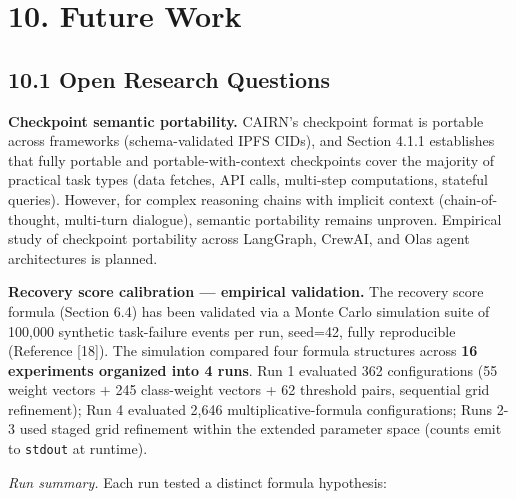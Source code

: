 \documentclass[
  10pt,
]{article}
\begin{document}
\hypertarget{future-work}{%
\section{10. Future Work}\label{future-work}}

\hypertarget{open-research-questions}{%
\subsection{10.1 Open Research
Questions}\label{open-research-questions}}

\textbf{Checkpoint semantic portability.} CAIRN's checkpoint format is
portable across frameworks (schema-validated IPFS CIDs), and Section
4.1.1 establishes that fully portable and portable-with-context
checkpoints cover the majority of practical task types (data fetches,
API calls, multi-step computations, stateful queries). However, for
complex reasoning chains with implicit context (chain-of-thought,
multi-turn dialogue), semantic portability remains unproven. Empirical
study of checkpoint portability across LangGraph, CrewAI, and Olas agent
architectures is planned.

\textbf{Recovery score calibration --- empirical validation.} The
recovery score formula (Section 6.4) has been validated via a Monte
Carlo simulation suite of 100,000 synthetic task-failure events per run,
seed=42, fully reproducible (Reference {[}18{]}). The simulation
compared four formula structures across \textbf{16 experiments organized
into 4 runs}. Run 1 evaluated 362 configurations (55 weight vectors +
245 class-weight vectors + 62 threshold pairs, sequential grid
refinement); Run 4 evaluated 2,646 multiplicative-formula
configurations; Runs 2-3 used staged grid refinement within the extended
parameter space (counts emit to \texttt{stdout} at runtime).

\emph{Run summary.} Each run tested a distinct formula hypothesis:
\end{document}
